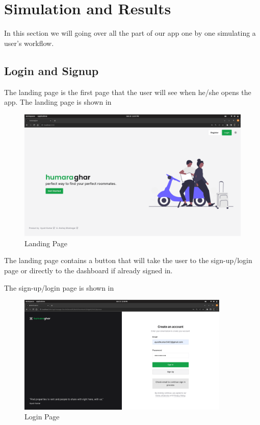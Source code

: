 
\chapter{Simulation and Results} %

\label{Chapter4}
In this section we will going over all the part of our app one by one simulating a user’s
workflow.\par\noindent

\section{Login and Signup}
The landing page is the
first page that the user will see when he/she opens the app. The landing page is shown in\par
\begin{figure}[h]
    \centering
    \includegraphics[width=1\textwidth]{Images/screenshots/landing.png}
    \caption{Landing Page}
\end{figure}
\noindent
The landing page contains a button that will take the user to the sign-up/login page or directly to the dashboard if
already signed in.\par\noindent

\clearpage
The sign-up/login page is shown in \par
\begin{figure}[h]
    \centering
    \includegraphics[width=0.9\textwidth]{Images/screenshots/signup.png}
    \caption{Login Page}
\end{figure}

